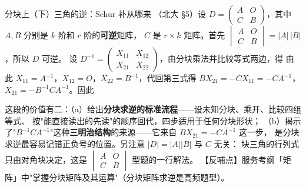 \begin{fdeep}{分块上（下）三角的逆：Schur 补从哪来}
（北大 §5）设 $D=\begin{pmatrix}A&O\\C&B\end{pmatrix}$，其中 $A,B$ 分别是 $k$ 阶和 $r$ 阶的\textbf{可逆}矩阵，
$C$ 是 $r\times k$ 矩阵。首先 $\begin{vmatrix}A&O\\C&B\end{vmatrix}=|A|\,|B|$，所以 $D$ 可逆。
设 $D^{-1}=\begin{pmatrix}X_{11}&X_{12}\\X_{21}&X_{22}\end{pmatrix}$，由分块乘法并比较等式两边，得
由此 $X_{11}=A^{-1}$，$X_{12}=O$，$X_{22}=B^{-1}$，代回第三式得 $BX_{21}=-CX_{11}=-CA^{-1}$，
$X_{21}=-B^{-1}CA^{-1}$。因此

这段的价值有二：（a）给出\textbf{分块求逆的标准流程}——设未知分块、乘开、比较四组等式、
按"能直接读出的先读"的顺序回代，四步适用于任何分块形状；
（b）揭示了"$B^{-1}CA^{-1}$"这种\textbf{三明治结构}的来源——它来自 $BX_{21}=-CA^{-1}$ 这一步，
是分块求逆最容易记错正负号的位置。另注意 $|D|=|A||B|$ 与 $C$ 无关：
块三角的行列式只由对角块决定，这是 $\begin{vmatrix}A&O\\C&B\end{vmatrix}$ 型题的一行解法。
【反哺点】服务考纲「矩阵」中"掌握分块矩阵及其运算"（分块矩阵求逆是高频题型）。
\end{fdeep}

